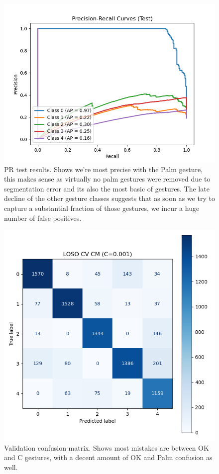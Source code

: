 \documentclass{article}
\begin{document}
\begin{figure}
  \centering
  \includegraphics[width=\linewidth]{PR_Test.png}
  \caption*{PR test results. Shows we're most precise with the Palm gesture, this makes sense as virtually no palm gestures were removed due to segmentation error and its also the most basic of gestures. The late decline of the other gesture classes suggests that as soon as we try to capture a substantial fraction of those gestures, we incur a huge number of false positives.}
\end{figure}

\begin{figure}
  \centering
  \includegraphics[width=\linewidth]{CM-linear-ovo-80x80-True-False-CV_new-new.png}
  \caption*{Validation confusion matrix. Shows most mistakes are between OK and C gestures, with a decent amount of OK and Palm confusion as well.} 
\end{figure}
\end{document}
